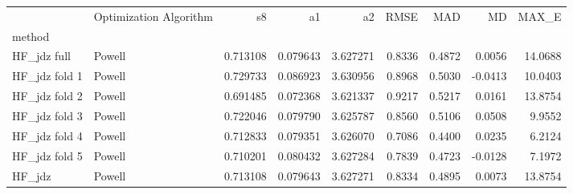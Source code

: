 \begin{tabular}{llrrrrrrr}
 & Optimization Algorithm & s8 & a1 & a2 & RMSE & MAD & MD & MAX_E \\
method &  &  &  &  &  &  &  &  \\
HF_jdz full & Powell & 0.713108 & 0.079643 & 3.627271 & 0.8336 & 0.4872 & 0.0056 & 14.0688 \\
HF_jdz fold 1 & Powell & 0.729733 & 0.086923 & 3.630956 & 0.8968 & 0.5030 & -0.0413 & 10.0403 \\
HF_jdz fold 2 & Powell & 0.691485 & 0.072368 & 3.621337 & 0.9217 & 0.5217 & 0.0161 & 13.8754 \\
HF_jdz fold 3 & Powell & 0.722046 & 0.079790 & 3.625787 & 0.8560 & 0.5106 & 0.0508 & 9.9552 \\
HF_jdz fold 4 & Powell & 0.712833 & 0.079351 & 3.626070 & 0.7086 & 0.4400 & 0.0235 & 6.2124 \\
HF_jdz fold 5 & Powell & 0.710201 & 0.080432 & 3.627284 & 0.7839 & 0.4723 & -0.0128 & 7.1972 \\
HF_jdz & Powell & 0.713108 & 0.079643 & 3.627271 & 0.8334 & 0.4895 & 0.0073 & 13.8754 \\
\end{tabular}
